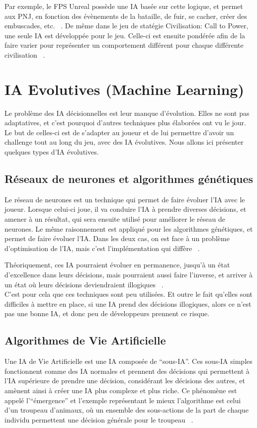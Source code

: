 \documentclass[asi]{picINSAIA}
\begin{document}
Par exemple, le FPS Unreal possède une IA basée sur cette logique, et permet aux PNJ, en fonction des évènements de la bataille, de fuir, se cacher, créer des embuscades, etc. ~\cite{CompGamesWithIntel}.
De même dans le jeu de statégie Civilisation: Call to Power, une seule IA est développée pour le jeu. Celle-ci est ensuite pondérée afin de la faire varier pour représenter un comportement différent pour chaque différente civilisation ~\cite{CompGamesWithIntel}.


\chapter{IA Evolutives (Machine Learning)}
Le problème des IA décisionnelles est leur manque d'évolution. Elles ne sont pas adaptatives, et c'est pourquoi d'autres techniques plus élaborées ont vu le jour. Le but de celles-ci est de s'adapter au joueur et de lui permettre d'avoir un challenge tout au long du jeu, avec des IA évolutives. Nous allons ici présenter quelques types d'IA évolutives.

\section{Réseaux de neurones et algorithmes génétiques}
Le réseau de neurones est un technique qui permet de faire évoluer l'IA avec le joueur. Lorsque celui-ci joue, il va conduire l'IA à prendre diverses décisions, et amener à un résultat, qui sera ensuite utilisé pour améliorer le réseau de neurones. Le même raisonnement est appliqué pour les algorithmes génétiques, et permet de faire évoluer l'IA. Dans les deux cas, on est face à un problème d'optimisation de l'IA, mais c'est l'implémentation qui diffère ~\cite{alvarez2013machine}.

Théoriquement, ces IA pourraient évoluer en permanence, jusqu'à un état d'excellence dans leurs décisions, mais pourraient aussi faire l'inverse, et arriver à un état où leurs décisions deviendraient illogiques ~\cite{CompGamesWithIntel}.\\
C'est pour cela que ces techniques sont peu utilisées. Et outre le fait qu'elles sont difficiles à mettre en place, si une IA prend des décisions illogiques, alors ce n'est pas une bonne IA, et donc peu de développeurs prennent ce risque.\\

\section{Algorithmes de Vie Artificielle}
Une IA de Vie Artificielle est une IA composée de ``sous-IA''. Ces sous-IA simples fonctionnent comme des IA normales et prennent des décisions qui permettent à l’IA supérieure de prendre une décision, considérant les décisions des autres, et amènent ainsi à créer une IA plus complexe et plus riche.
Ce phénomène est appelé l'``émergence'' et l'exemple représentant le mieux l'algorithme est celui d'un troupeau d'animaux, où un ensemble des sous-actions de la part de chaque individu permettent une décision générale pour le troupeau ~\cite{CompGamesWithIntel}.
\end{document}
